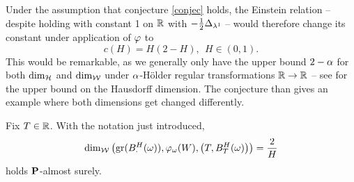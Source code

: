 Under the assumption that conjecture \ref{conjec} holds, the Einstein relation -- despite holding with constant 1 on 
$\mathbb{R}$ with $-\frac{1}{2}\Delta_{\lambda^1}$ -- would therefore change its constant under application of $\varphi$ to
\[
  c(H)=H(2-H),\ \ H\in(0,1).
\]
This would be remarkable, as we generally only have the upper bound $2-\alpha$ for both $\dim_{\mathcal{H}}$ and $\dim_{\mathcal{W}}$ under $\alpha$-H\"older regular transformations $\mathbb{R}\to\mathbb{R}$ -- see \cite[chapter 16]{falconer2007fractal} for the upper bound on the Hausdorff dimension. The conjecture than gives an example where both dimensions get changed differently.
\begin{lem}
  Fix $T\in\mathbb{R}$. With the notation just introduced, 
  \begin{equation}\label{eq:BMdimw}
    \dim_{\mathcal{W}}\left(\operatorname{gr}(B^H_\cdot(\omega)),\varphi_\omega(W),\left(T,B^H_T(\omega)\right)\right)
    =\frac{2}{H}
  \end{equation}
  holds $\mathbf{P}$-almost surely.
\end{lem}
